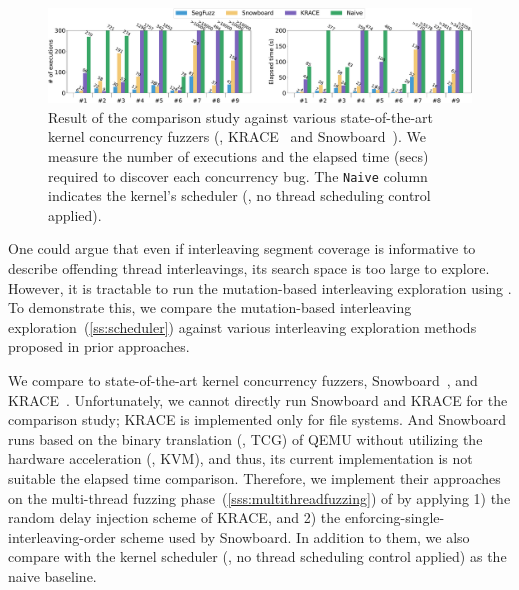 \begin{figure}[t]
  \centering
  \includegraphics[width=0.99\linewidth]{fig/comparison_graph_execution-crop.pdf}
  \caption{Result of the comparison study against various
    state-of-the-art kernel concurrency fuzzers (\ie,
    KRACE~\cite{krace} and Snowboard~\cite{snowboard}). We measure the
    number of executions and the elapsed time (secs) required to
    discover each concurrency bug. The \texttt{Naive} column indicates
    the kernel's scheduler (\ie, no thread scheduling control
    applied).}
  \label{fig:eval:comparison}
\end{figure}

%
One could argue that even if interleaving segment coverage is
informative to describe offending thread interleavings, 
its search space is too large to explore.
%
However, it is tractable to run the mutation-based interleaving exploration
using \intcov.
To demonstrate this, we compare the mutation-based interleaving
exploration~(\autoref{ss:scheduler}) against various interleaving
exploration methods proposed in prior approaches.

%
We compare \sys to state-of-the-art kernel concurrency fuzzers,
Snowboard~\cite{snowboard}, and KRACE~\cite{krace}.
%
Unfortunately, we cannot directly run Snowboard and KRACE for the
comparison study; KRACE is implemented only for file systems. And
Snowboard runs based on the binary translation (\ie, TCG) of QEMU
without utilizing the hardware acceleration (\ie, KVM), and thus, its
current implementation is not suitable the elapsed time comparison.
%
Therefore, we implement their approaches on the multi-thread fuzzing
phase~(\autoref{sss:multithreadfuzzing}) of \sys by applying 1) the
random delay injection scheme of KRACE, and 2) the
enforcing-single-interleaving-order scheme used by Snowboard.
%
In addition to them, we also compare with the kernel scheduler 
(\ie, no thread scheduling control applied) as the naive baseline.


